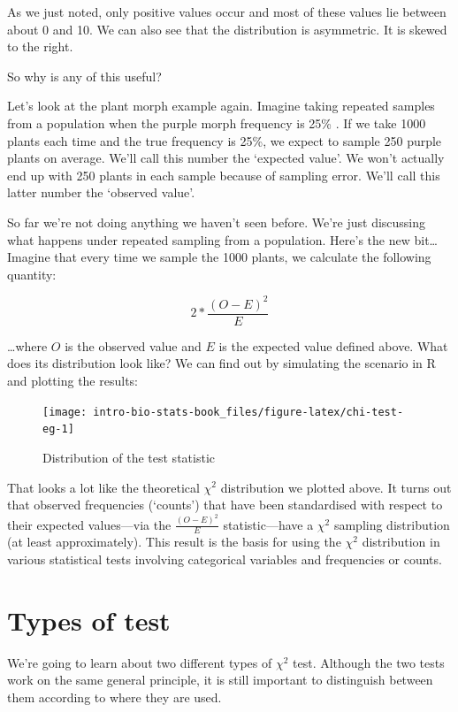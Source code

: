 \documentclass[
]{book}
\begin{document}
As we just noted, only positive values occur and most of these values lie between about 0 and 10. We can also see that the distribution is asymmetric. It is skewed to the right.

So why is any of this useful?

Let's look at the plant morph example again. Imagine taking repeated samples from a population when the purple morph frequency is 25\% . If we take 1000 plants each time and the true frequency is 25\%, we expect to sample 250 purple plants on average. We'll call this number the `expected value'. We won't actually end up with 250 plants in each sample because of sampling error. We'll call this latter number the `observed value'.

So far we're not doing anything we haven't seen before. We're just discussing what happens under repeated sampling from a population. Here's the new bit\ldots{} Imagine that every time we sample the 1000 plants, we calculate the following quantity:

\[2*\frac{(O-E)^{2}}{E}\]

\ldots where \(O\) is the observed value and \(E\) is the expected value defined above. What does its distribution look like? We can find out by simulating the scenario in R and plotting the results:

\begin{figure}

{\centering \texttt{[image: intro-bio-stats-book\_files/figure-latex/chi-test-eg-1]} 

}

\caption{Distribution of the test statistic}\label{fig:chi-test-eg}
\end{figure}

That looks a lot like the theoretical \(\chi^2\) distribution we plotted above. It turns out that observed frequencies (`counts') that have been standardised with respect to their expected values---via the \(\frac{(O-E)^{2}}{E}\) statistic---have a \(\chi^2\) sampling distribution (at least approximately). This result is the basis for using the \(\chi^2\) distribution in various statistical tests involving categorical variables and frequencies or counts.

\hypertarget{types-of-test}{%
\section{Types of test}\label{types-of-test}}

We're going to learn about two different types of \(\chi^2\) test. Although the two tests work on the same general principle, it is still important to distinguish between them according to where they are used.
\end{document}
